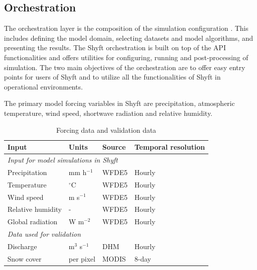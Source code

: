 \subsection{Orchestration}

The orchestration layer is the composition of the simulation configuration \autocite{burkhartShyftV4Framework2021}. This includes defining the model domain, selecting datasets and model algorithms, and presenting the results. The Shyft orchestration is built on top of the API functionalities and offers utilities for configuring, running and post-processing of simulation. The two main objectives of the orchestration are to offer easy entry points for users of Shyft and to utilize all the functionalities of Shyft in operational environments.


The primary model forcing variables in Shyft are precipitation, atmospheric temperature, wind speed, shortwave radiation and relative humidity. 


\begin{table}[ht]
\centering
\caption{Forcing data and validation data}
\label{tab:forcing_validation}
\begin{tabular}{llll}
\toprule
\textbf{Input}    & \textbf{Units}   & \textbf{Source} & \textbf{Temporal resolution} \\
\hline
\multicolumn{4}{l}{\textit{Input for model simulations in Shyft}}                     \\
\hline
Precipitation     & mm h$^{-1}$      & WFDE5           & Hourly                       \\
Temperature       & $^{\circ}$C      & WFDE5           & Hourly                       \\
Wind speed        & m s$^{-1}$       & WFDE5           & Hourly                       \\
Relative humidity & -                & WFDE5           & Hourly                       \\
Global radiation  & W m$^{-2}$       & WFDE5           & Hourly                       \\
\hline
\multicolumn{4}{l}{\textit{Data used for validation}}                                 \\
\hline
Discharge         & m$^{3}$ s$^{-1}$ & DHM             & Hourly                       \\
Snow cover        & per pixel        & MODIS           & 8-day    \\
\bottomrule
\end{tabular}%
\end{table}


